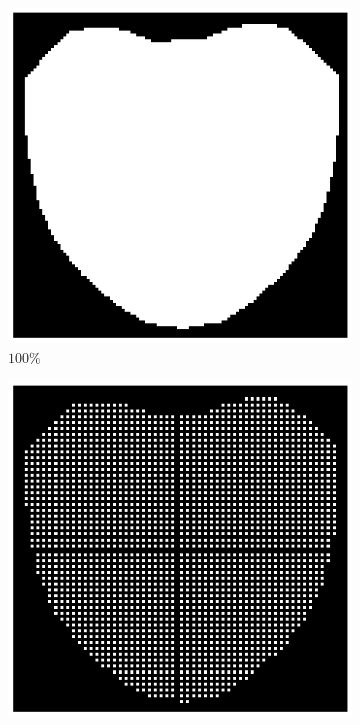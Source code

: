 \begin{figure}[t!]
	\centering
	\begin{subfigure}{0.16\textwidth}
		\includegraphics[width=\textwidth]{figures/sampling_100.png}
		\caption{$100\%$}
		\label{fig:sampling_100}
	\end{subfigure}
	\begin{subfigure}{0.16\textwidth}
		\includegraphics[width=\textwidth]{figures/sampling_50.png}

\end{subfigure}
\end{figure}
